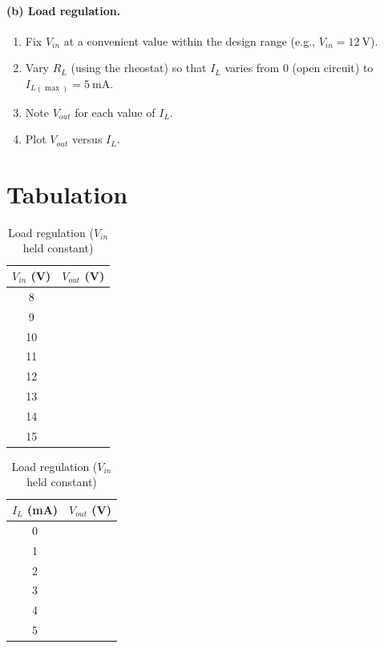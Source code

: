 \paragraph{(b) Load regulation.}
\begin{enumerate}
	\item Fix $V_{in}$ at a convenient value within the design range (e.g., $V_{in} = 12\ \text{V}$).
	\item Vary $R_L$ (using the rheostat) so that $I_L$ varies from $0$ (open circuit) to $I_{L(\max)} = 5\ \text{mA}$.
	\item Note $V_{out}$ for each value of $I_L$.
	\item Plot $V_{out}$ versus $I_L$.
\end{enumerate}

\section{Tabulation}

\begin{table}[htbp]
\begin{minipage}{0.5\linewidth}
	\centering
	\begin{tabular}{@{}cc@{}}
		\toprule
		$V_{in}$ (V) & $V_{out}$ (V) \\
		\midrule
		8  & \\
		9  & \\
		10 & \\
		11 & \\
		12 & \\
		13 & \\
		14 & \\
		15 & \\
		\bottomrule
	\end{tabular}
	\caption{Line regulation ($I_L$ held at $5\ \text{mA}$)}
	\label{tab:lineRegulationObs}
\end{minipage}
\begin{minipage}{0.5\linewidth}
	\centering
	\begin{tabular}{@{}cc@{}}
		\toprule
		$I_L$ (mA) & $V_{out}$ (V) \\
		\midrule
		0   & \\
		1   & \\
		2   & \\
		3   & \\
		4   & \\
		5   & \\
		\bottomrule
	\end{tabular}
	\caption{Load regulation ($V_{in}$ held constant)}
	\label{tab:loadRegulationObs}
\end{minipage}
\end{table}

